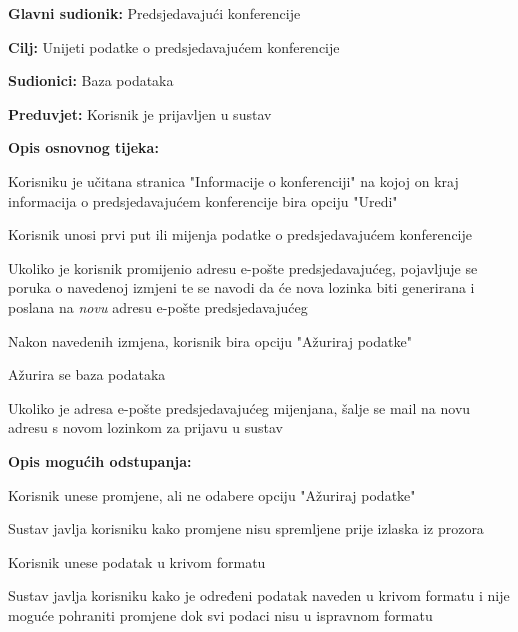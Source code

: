 					\noindent {}
					\begin{packed_item}
						\item \textbf{Glavni sudionik:} Predsjedavajući konferencije
						\item \textbf{Cilj:} Unijeti podatke o predsjedavajućem konferencije
						\item \textbf{Sudionici:} Baza podataka
						\item \textbf{Preduvjet:} Korisnik je prijavljen u sustav
						
						\item \textbf{Opis osnovnog tijeka:} 
						\item[] \begin{packed_enum}
							\item Korisniku je učitana stranica "Informacije o konferenciji" na kojoj on kraj informacija o predsjedavajućem konferencije bira opciju "Uredi"
							\item Korisnik unosi prvi put ili mijenja podatke o predsjedavajućem konferencije
							\item Ukoliko je korisnik promijenio adresu e-pošte predsjedavajućeg, pojavljuje se poruka o navedenoj izmjeni te se navodi da će nova lozinka biti generirana i poslana na \textit{novu} adresu e-pošte predsjedavajućeg
							\item Nakon navedenih izmjena, korisnik bira opciju "Ažuriraj podatke"
							\item Ažurira se baza podataka
							\item Ukoliko je adresa e-pošte predsjedavajućeg mijenjana, šalje se mail na novu adresu s novom lozinkom za prijavu u sustav
						\end{packed_enum}
					
						\item \textbf{Opis mogućih odstupanja:}
						\item[] \begin{packed_enum}

							\item[3.a] Korisnik unese promjene, ali ne odabere opciju "Ažuriraj podatke"
							\item[] \begin{packed_enum}
								\item[1.] Sustav javlja korisniku kako promjene nisu spremljene prije izlaska iz prozora
							\end{packed_enum}
							\item[3.b] Korisnik unese podatak u krivom formatu
							\item[] \begin{packed_enum}
								\item[1.] Sustav javlja korisniku kako je određeni podatak naveden u krivom formatu i nije moguće pohraniti promjene dok svi podaci nisu u ispravnom formatu
							\end{packed_enum}
							
						\end{packed_enum}
					\end{packed_item}

